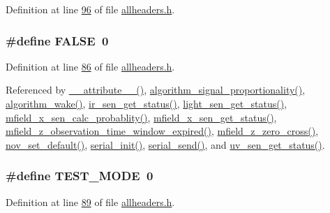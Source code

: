 Definition at line \hyperlink{a00040_source_l00096}{96} of file \hyperlink{a00040_source}{allheaders.\+h}.

\hypertarget{a00040_aa93f0eb578d23995850d61f7d61c55c1}{
\subsubsection[{F\+A\+L\+S\+E}]{\setlength{\rightskip}{0pt plus 5cm}\#define F\+A\+L\+S\+E~0}}\label{a00040_aa93f0eb578d23995850d61f7d61c55c1}


Definition at line \hyperlink{a00040_source_l00086}{86} of file \hyperlink{a00040_source}{allheaders.\+h}.



Referenced by \hyperlink{a00030_source_l00758}{\+\_\+\+\_\+attribute\+\_\+\+\_\+()}, \hyperlink{a00038_source_l00242}{algorithm\+\_\+signal\+\_\+proportionality()}, \hyperlink{a00038_source_l00670}{algorithm\+\_\+wake()}, \hyperlink{a00045_source_l00302}{ir\+\_\+sen\+\_\+get\+\_\+status()}, \hyperlink{a00047_source_l00204}{light\+\_\+sen\+\_\+get\+\_\+status()}, \hyperlink{a00052_source_l00242}{mfield\+\_\+x\+\_\+sen\+\_\+calc\+\_\+probablity()}, \hyperlink{a00050_source_l00276}{mfield\+\_\+x\+\_\+sen\+\_\+get\+\_\+status()}, \hyperlink{a00053_source_l00241}{mfield\+\_\+z\+\_\+observation\+\_\+time\+\_\+window\+\_\+expired()}, \hyperlink{a00053_source_l00203}{mfield\+\_\+z\+\_\+zero\+\_\+cross()}, \hyperlink{a00060_source_l00760}{nov\+\_\+set\+\_\+default()}, \hyperlink{a00030_source_l00159}{serial\+\_\+init()}, \hyperlink{a00030_source_l00577}{serial\+\_\+send()}, and \hyperlink{a00073_source_l00302}{uv\+\_\+sen\+\_\+get\+\_\+status()}.

\hypertarget{a00040_ab6d58cce6e97b6b549801e696ac9f4f6}{
\subsubsection[{T\+E\+S\+T\+\_\+\+M\+O\+D\+E}]{\setlength{\rightskip}{0pt plus 5cm}\#define T\+E\+S\+T\+\_\+\+M\+O\+D\+E~0}}\label{a00040_ab6d58cce6e97b6b549801e696ac9f4f6}


Definition at line \hyperlink{a00040_source_l00089}{89} of file \hyperlink{a00040_source}{allheaders.\+h}.

